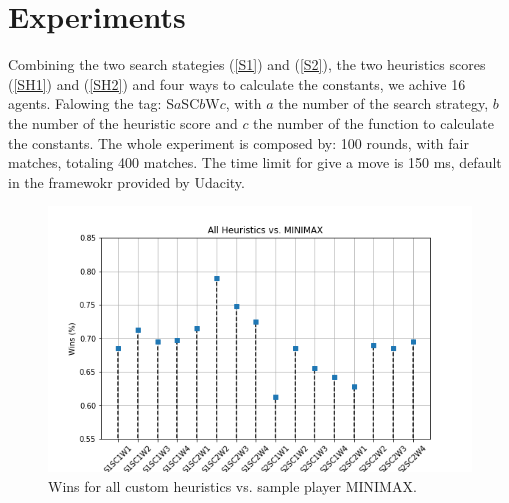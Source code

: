 \documentclass[a4paper]{article}
\begin{document}
\section{Experiments}

Combining the two search stategies (\ref{S1}) and (\ref{S2}), the two heuristics scores (\ref{SH1}) and (\ref{SH2}) and four ways to calculate the constants, we achive 16 agents. Falowing the tag: S$a$SC$b$W$c$, with $a$ the number of the search strategy, $b$ the number of the heuristic score and $c$ the number of the function to calculate the constants. The whole experiment is composed by: 100 rounds, with fair matches, totaling 400 matches. The time limit for give a move is 150 ms, default in the framewokr provided by Udacity.

\begin{figure}[htpb]
\begin{center}
\includegraphics[width=1\columnwidth]{fig/results_Wins_All_vs_MINIMAX.png}
\caption{Wins for all custom heuristics vs. sample player MINIMAX.}
\end{center}
\label{figwinsMINIMAX}
\end{figure}
    
\end{document}

